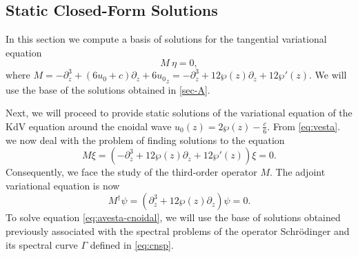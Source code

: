 \documentclass[a4paper,12pt]{article}
\begin{document}

\subsection{Static Closed-Form Solutions}\label{sec-nu-0}


In this section we compute a basis of solutions for the tangential variational equation
\begin{equation}\label{ec-nu=0-for sol}
    M\ {\eta}=0 ,
\end{equation}
where $ M={-\partial_z^3+(6u_0+c)\partial_z  +6{u_0}_z
} = -\partial_z^3+12\wp(z)\partial_z  + 12\wp'(z) $. We will use the base of the solutions obtained in \ref{sec-A}.  



Next, we will proceed to provide static solutions of the variational equation of the KdV equation around the cnoidal wave $u_{0} (z)=2\wp(z)-\frac{c}{6}$. From \eqref{eq:vesta}. we now deal with the problem of finding solutions to the equation
\begin{equation}%
   M\xi = ( -\partial_z^3+12\wp(z)\partial_z  + 12\wp'(z) )\xi =0.
\end{equation}
Consequently, we face the study of the third-order operator $M$.
The adjoint variational equation is now
\begin{equation}\label{eq:avesta-cnoidal}
  M^\dag \psi  =(\partial_z^3+12\wp(z)\partial_z)\psi =0 .
\end{equation}
To solve equation \eqref{eq:avesta-cnoidal}, we will use the base of solutions obtained previously associated with the spectral problems of the operator Schr\"odinger and its spectral  curve $\Gamma$ defined in \eqref{eq:cnsp}.
\end{document}
